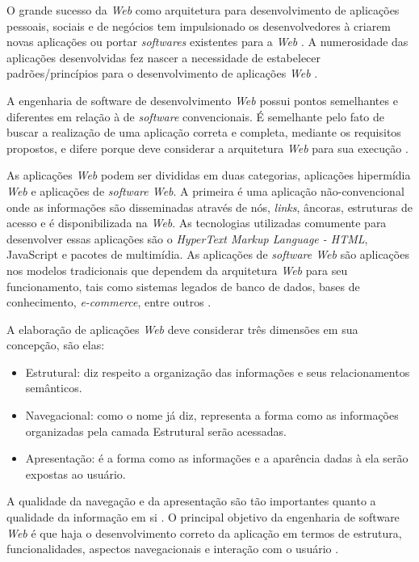 O grande sucesso da \textit{Web} como arquitetura para desenvolvimento de aplicações pessoais, sociais e de negócios tem impulsionado os desenvolvedores à criarem novas aplicações ou portar \textit{softwares} existentes para a \textit{Web} \cite{fraternali1998conceptual}. A numerosidade das aplicações desenvolvidas fez nascer a necessidade de estabelecer padrões/princípios para o desenvolvimento de aplicações \textit{Web} \cite{pressman2000tangled}.
   
A engenharia de software de desenvolvimento \textit{Web} possui pontos semelhantes e diferentes em relação à de \textit{software} convencionais. É semelhante pelo fato de buscar a realização de uma aplicação correta e completa, mediante os requisitos propostos, e difere porque deve considerar a arquitetura \textit{Web} para sua execução \cite{conte2005processos}.

As aplicações \textit{Web} podem ser divididas em duas categorias, aplicações hipermídia \textit{Web} e aplicações de \textit{software Web}. A primeira é uma aplicação não-convencional onde as informações são disseminadas através de nós, \textit{links}, âncoras, estruturas de acesso e é disponibilizada na \textit{Web}. As tecnologias utilizadas comumente para desenvolver essas aplicações são o \textit{HyperText Markup Language - HTML}, JavaScript e pacotes de multimídia. As aplicações de \textit{software Web} são aplicações nos modelos tradicionais que dependem da arquitetura \textit{Web} para seu funcionamento, tais como sistemas legados de banco de dados, bases de conhecimento, \textit{e-commerce}, entre outros \cite{mendes2005investigating}.

A elaboração de aplicações \textit{Web} deve considerar três dimensões em sua concepção, são elas:

\begin{itemize}
	\item Estrutural: diz respeito a organização das informações e seus relacionamentos semânticos.
	\item Navegacional: como o nome já diz, representa a forma como as informações organizadas pela camada Estrutural serão acessadas.
	\item Apresentação: é a forma como as informações e a aparência dadas à ela serão expostas ao usuário.
\end{itemize}

A qualidade da navegação e da apresentação são tão importantes quanto a qualidade da informação em si \cite{fraternali1998conceptual}. O principal objetivo da engenharia de software \textit{Web} é que haja o desenvolvimento correto da aplicação em termos de estrutura, funcionalidades, aspectos navegacionais e interação com o usuário \cite{pastor2004fitting}.

